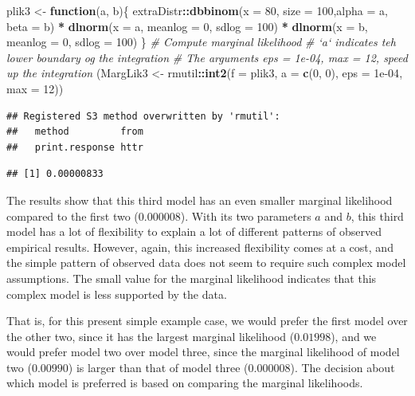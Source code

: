 \documentclass[12pt,]{krantz}
\newenvironment{Shaded}{\begin{snugshade}}{\end{snugshade}}
\newcommand{\CommentTok}[1]{\textcolor[rgb]{0.56,0.35,0.01}{\textit{#1}}}
\newcommand{\ControlFlowTok}[1]{\textcolor[rgb]{0.13,0.29,0.53}{\textbf{#1}}}
\newcommand{\DataTypeTok}[1]{\textcolor[rgb]{0.13,0.29,0.53}{#1}}
\newcommand{\DecValTok}[1]{\textcolor[rgb]{0.00,0.00,0.81}{#1}}
\newcommand{\FloatTok}[1]{\textcolor[rgb]{0.00,0.00,0.81}{#1}}
\newcommand{\KeywordTok}[1]{\textcolor[rgb]{0.13,0.29,0.53}{\textbf{#1}}}
\newcommand{\NormalTok}[1]{#1}
\newcommand{\OperatorTok}[1]{\textcolor[rgb]{0.81,0.36,0.00}{\textbf{#1}}}
\newcommand{\StringTok}[1]{\textcolor[rgb]{0.31,0.60,0.02}{#1}}
\theoremstyle{definition}
\theoremstyle{definition}
\theoremstyle{definition}
\theoremstyle{remark}
\begin{document}
\begin{Shaded}
\begin{Highlighting}[]
\NormalTok{plik3 <-}\StringTok{ }\ControlFlowTok{function}\NormalTok{(a, b)\{}
\NormalTok{  extraDistr}\OperatorTok{::}\KeywordTok{dbbinom}\NormalTok{(}\DataTypeTok{x =} \DecValTok{80}\NormalTok{, }\DataTypeTok{size =} \DecValTok{100}\NormalTok{,}\DataTypeTok{alpha =}\NormalTok{ a, }\DataTypeTok{beta =}\NormalTok{ b) }\OperatorTok{*}
\StringTok{    }\KeywordTok{dlnorm}\NormalTok{(}\DataTypeTok{x =}\NormalTok{ a, }\DataTypeTok{meanlog =} \DecValTok{0}\NormalTok{, }\DataTypeTok{sdlog =} \DecValTok{100}\NormalTok{) }\OperatorTok{*}
\StringTok{    }\KeywordTok{dlnorm}\NormalTok{(}\DataTypeTok{x =}\NormalTok{ b, }\DataTypeTok{meanlog =} \DecValTok{0}\NormalTok{, }\DataTypeTok{sdlog =} \DecValTok{100}\NormalTok{)}
\NormalTok{\}}
\CommentTok{# Compute marginal likelihood}
\CommentTok{# `a` indicates teh lower boundary og the integration}
\CommentTok{# The arguments eps = 1e-04, max = 12, speed up the integration}
\NormalTok{(MargLik3 <-}\StringTok{ }\NormalTok{rmutil}\OperatorTok{::}\KeywordTok{int2}\NormalTok{(}\DataTypeTok{f =}\NormalTok{ plik3, }\DataTypeTok{a =} \KeywordTok{c}\NormalTok{(}\DecValTok{0}\NormalTok{, }\DecValTok{0}\NormalTok{), }\DataTypeTok{eps =} \FloatTok{1e-04}\NormalTok{, }\DataTypeTok{max =} \DecValTok{12}\NormalTok{))}
\end{Highlighting}
\end{Shaded}

\begin{verbatim}
## Registered S3 method overwritten by 'rmutil':
##   method         from
##   print.response httr
\end{verbatim}

\begin{verbatim}
## [1] 0.00000833
\end{verbatim}

The results show that this third model has an even smaller marginal likelihood compared to the first two (\(0.000008\)). With its two parameters \(a\) and \(b\), this third model has a lot of flexibility to explain a lot of different patterns of observed empirical results. However, again, this increased flexibility comes at a cost, and the simple pattern of observed data does not seem to require such complex model assumptions. The small value for the marginal likelihood indicates that this complex model is less supported by the data.

That is, for this present simple example case, we would prefer the first model over the other two, since it has the largest marginal likelihood (\(0.01998\)), and we would prefer model two over model three, since the marginal likelihood of model two (\(0.00990\)) is larger than that of model three (\(0.000008\)). The decision about which model is preferred is based on comparing the marginal likelihoods.
\end{document}
